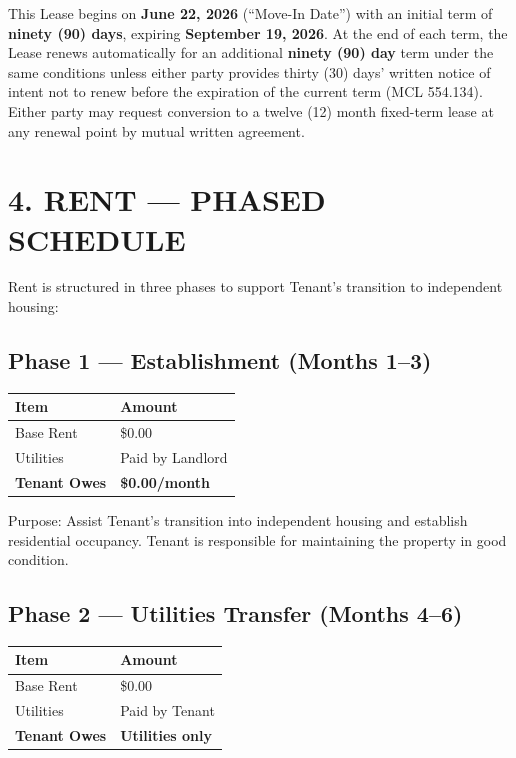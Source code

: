 \documentclass[11pt]{article}
\begin{document}
This Lease begins on \textbf{June 22, 2026} (``Move-In Date'') with an
initial term of \textbf{ninety (90) days}, expiring
\textbf{September 19, 2026}. At the end of each term, the Lease renews
automatically for an additional \textbf{ninety (90) day} term under the
same conditions unless either party provides thirty (30) days' written
notice of intent not to renew before the expiration of the current term
(MCL 554.134). Either party may request conversion to a twelve (12) month
fixed-term lease at any renewal point by mutual written agreement.

\section{4. RENT --- PHASED SCHEDULE}

Rent is structured in three phases to support Tenant's transition to
independent housing:

\subsection{Phase 1 --- Establishment (Months 1--3)}

\begin{tabular}{ll}
\toprule
Item & Amount \\
\midrule
Base Rent & \$0.00 \\
Utilities & Paid by Landlord \\
\textbf{Tenant Owes} & \textbf{\$0.00/month} \\
\bottomrule
\end{tabular}

\medskip
Purpose: Assist Tenant's transition into independent housing and establish
residential occupancy. Tenant is responsible for maintaining the property
in good condition.

\subsection{Phase 2 --- Utilities Transfer (Months 4--6)}

\begin{tabular}{ll}
\toprule
Item & Amount \\
\midrule
Base Rent & \$0.00 \\
Utilities & Paid by Tenant \\
\textbf{Tenant Owes} & \textbf{Utilities only} \\
\bottomrule
\end{tabular}
\end{document}
